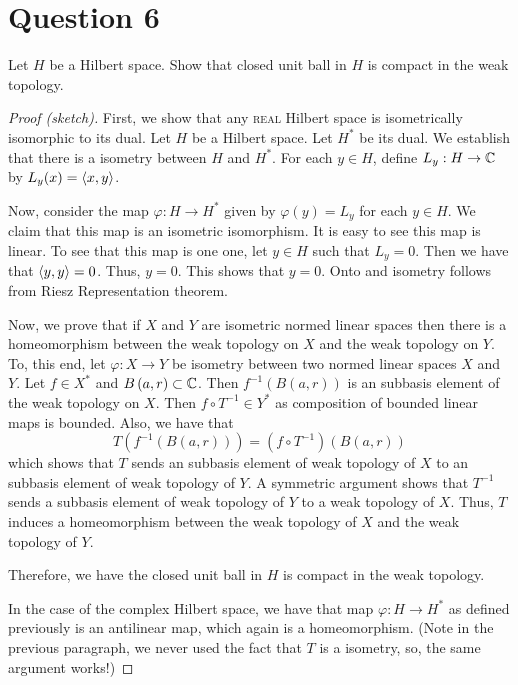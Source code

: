 \section{Question 6}
\horz

Let $H$ be a Hilbert space. Show that closed unit ball in $H$ is compact in the weak topology.

\horz

\begin{proof}[Proof (sketch)]
    First, we show that any \textsc{real} Hilbert space is isometrically isomorphic to its dual. Let $H$ be a Hilbert space. Let $H^{*}$ be its dual. We establish that there is a isometry between $H$ and $H^{*}$. For each $y\in H$, define $L_{y} : H \to \mathbb C$ by $L_{y} (x) = \left\langle x,y \right\rangle$.

    Now, consider the map $\varphi : H \to H^{*}$ given by $\varphi \left( y \right) = L_{y}$ for each $y\in H$. We claim that this map is an isometric isomorphism. It is easy to see this map is linear. To see that this map is one one, let $y \in H$ such that $L_{y} = 0$. Then we have that $\left\langle y,y \right\rangle =0$. Thus, $y=0$. This shows that $y =0$. Onto and isometry follows from Riesz Representation theorem.

    Now, we prove that if $X$ and $Y$ are isometric normed linear spaces then there is a homeomorphism between the weak topology on $X$ and the weak topology on $Y$. To, this end, let $\varphi : X \to Y$ be isometry between two normed linear spaces $X$ and $Y$. Let $f \in X^{*}$ and $B\left( a,r \right) \subset \mathbb C$. Then $f^{-1} \left( B\left( a,r \right) \right)$ is an subbasis element of the weak topology on $X$. Then $f \circ T^{-1} \in Y^{*}$ as composition of bounded linear maps is bounded. Also, we have that 
    \begin{equation*}
	T\left( f^{-1} \left( B\left( a,r \right) \right) \right) = \left( f\circ T^{-1} \right) \left( B\left( a,r \right) \right)
    \end{equation*}
    which shows that $T$ sends an subbasis element of weak topology of $X$ to an subbasis element of weak topology of $Y$. A symmetric argument shows that $T^{-1}$ sends a subbasis element of weak topology of $Y$ to a weak topology of $X$. Thus, $T$ induces a homeomorphism between the weak topology of $X$ and the weak topology of $Y$.

    Therefore, we have the closed unit ball in $H$ is compact in the weak topology.

    In the case of the complex Hilbert space, we have that map $\varphi : H \to H^{*}$ as defined previously is an antilinear map, which again is a homeomorphism. (Note in the previous paragraph, we never used the fact that $T$ is a isometry, so, the same argument works!)
\end{proof}

